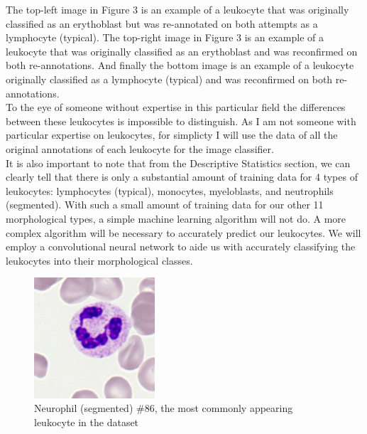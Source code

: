 \documentclass[12pt]{article}
\newcommand\tab[1][1cm]{\hspace*{#1}}
\begin{document}
\tab The top-left image in Figure 3 is an example of a leukocyte that was originally classified as an erythoblast but was re-annotated on both attempts as a lymphocyte (typical). The top-right image in Figure 3 is an example of a leukocyte that was originally classified as an erythoblast and was reconfirmed on both re-annotations. And finally the bottom image is an example of a leukocyte originally classified as a lymphocyte (typical) and was reconfirmed on both re-annotations.\\
\tab To the eye of someone without expertise in this particular field the differences between these leukocytes is impossible to distinguish. As I am not someone with particular expertise on leukocytes, for simplicty I will use the data of all the original annotations of each leukocyte for the image classifier. \\
\newpage
\tab It is also important to note that from the Descriptive Statistics section, we can clearly tell that there is only a substantial amount of training data for 4 types of leukocytes:  lymphocytes (typical), monocytes, myeloblasts, and neutrophils (segmented). With such a small amount of training data for our other 11 morphological types, a simple machine learning algorithm will not do. A more complex algorithm will be necessary to accurately predict our leukocytes. We will employ a convolutional neural network to aide us with accurately classifying the leukocytes into their morphological classes.

\begin{figure}[!htb]
		\centering
		\includegraphics[width=0.4\textwidth]{NGS_0086.png}
		\caption{\label{: }Neurophil (segmented) \#86, the most commonly appearing leukocyte in the dataset}
	\end{figure} 
\end{document}
